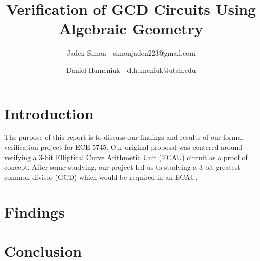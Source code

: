 \documentclass[12pt]{report}
\title{Verification of GCD Circuits Using Algebraic Geometry}
\author{Jaden Simon - simonjaden223@gmail.com \\ \and
	   Daniel Humeniuk - d.humeniuk@utah.edu}
\begin{document}
\maketitle

\section{Introduction}

The purpose of this report is to discuss our findings and results of our formal verification project for ECE 5745. Our original proposal was centered around verifying a 3-bit Elliptical Curve Arithmetic Unit (ECAU) circuit as a proof of concept. After some studying, our project led us to studying a 3-bit greatest common divisor (GCD) which would be required in an ECAU. 

\section{Findings}

\section{Conclusion}




\end{document}
